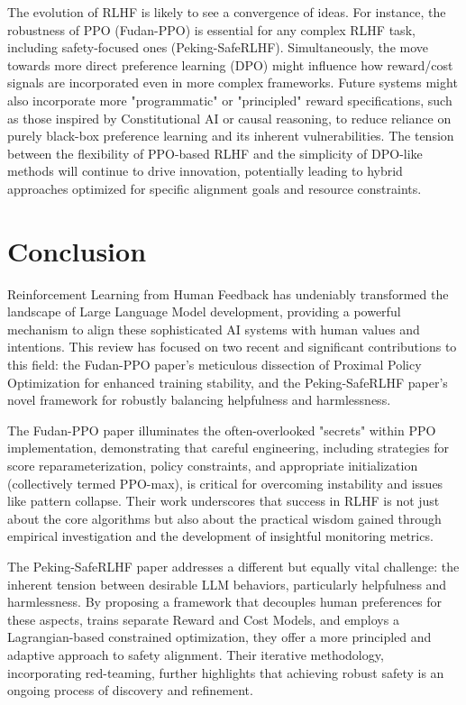 \documentclass[10pt,journal,compsoc]{IEEEtran} %
\begin{document}
The evolution of RLHF is likely to see a convergence of ideas. For instance, the robustness of PPO (Fudan-PPO) is essential for any complex RLHF task, including safety-focused ones (Peking-SafeRLHF). Simultaneously, the move towards more direct preference learning (DPO) might influence how reward/cost signals are incorporated even in more complex frameworks. Future systems might also incorporate more "programmatic" or "principled" reward specifications, such as those inspired by Constitutional AI or causal reasoning, to reduce reliance on purely black-box preference learning and its inherent vulnerabilities. The tension between the flexibility of PPO-based RLHF and the simplicity of DPO-like methods will continue to drive innovation, potentially leading to hybrid approaches optimized for specific alignment goals and resource constraints.

\section{Conclusion}
\label{sec:conclusion}

Reinforcement Learning from Human Feedback has undeniably transformed the landscape of Large Language Model development, providing a powerful mechanism to align these sophisticated AI systems with human values and intentions. This review has focused on two recent and significant contributions to this field: the Fudan-PPO paper's meticulous dissection of Proximal Policy Optimization for enhanced training stability, and the Peking-SafeRLHF paper's novel framework for robustly balancing helpfulness and harmlessness.  

The Fudan-PPO paper illuminates the often-overlooked "secrets" within PPO implementation, demonstrating that careful engineering, including strategies for score reparameterization, policy constraints, and appropriate initialization (collectively termed PPO-max), is critical for overcoming instability and issues like pattern collapse. Their work underscores that success in RLHF is not just about the core algorithms but also about the practical wisdom gained through empirical investigation and the development of insightful monitoring metrics.

The Peking-SafeRLHF paper addresses a different but equally vital challenge: the inherent tension between desirable LLM behaviors, particularly helpfulness and harmlessness. By proposing a framework that decouples human preferences for these aspects, trains separate Reward and Cost Models, and employs a Lagrangian-based constrained optimization, they offer a more principled and adaptive approach to safety alignment. Their iterative methodology, incorporating red-teaming, further highlights that achieving robust safety is an ongoing process of discovery and refinement.
\end{document}
